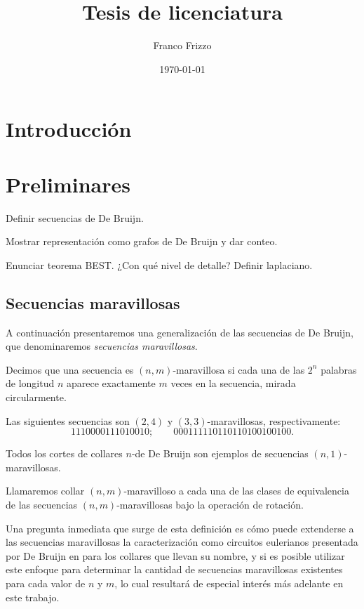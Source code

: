 \documentclass[11pt]{article}
\newcommand\myauthor{Franco Frizzo}
\newcommand\mytitle{Tesis de licenciatura}
\newcommand\mydate{\today}
\begin{document}
\title{\mytitle}
\author{\myauthor}
\date{\mydate}

\maketitle
\tableofcontents

\section{Introducción}

\section{Preliminares}

Definir secuencias de De Bruijn.

Mostrar representación como grafos de De Bruijn y dar conteo.

Enunciar teorema BEST. ¿Con qué nivel de detalle? Definir laplaciano.

\subsection{Secuencias maravillosas}

A continuación presentaremos una generalización de las secuencias de De Bruijn,
que denominaremos \emph{secuencias maravillosas}.

Decimos que una secuencia es $(n,m)$-maravillosa si cada una de las $2^n$
palabras de longitud $n$ aparece exactamente $m$ veces en la secuencia, mirada
circularmente.

\begin{examples}
	Las siguientes secuencias son $(2,4)$ y $(3,3)$-maravillosas, respectivamente:
	\[ 1110000111010010; \qquad 000111110110110100100100.
	\]

	Todos los cortes de collares $n$-de De Bruijn son ejemplos de secuencias
	$(n,1)$-maravillosas.
\end{examples}

Llamaremos collar $(n,m)$-maravilloso a cada una de las clases de equivalencia
de las secuencias $(n,m)$-maravillosas bajo la operación de rotación.

Una pregunta inmediata que surge de esta definición es cómo puede extenderse a
las secuencias maravillosas la caracterización como circuitos eulerianos
presentada por De Bruijn en \cite{db} para los collares que llevan su nombre, y
si es posible utilizar este enfoque para determinar la cantidad de secuencias
maravillosas existentes para cada valor de $n$ y $m$, lo cual resultará de
especial interés más adelante en este trabajo.
\end{document}
